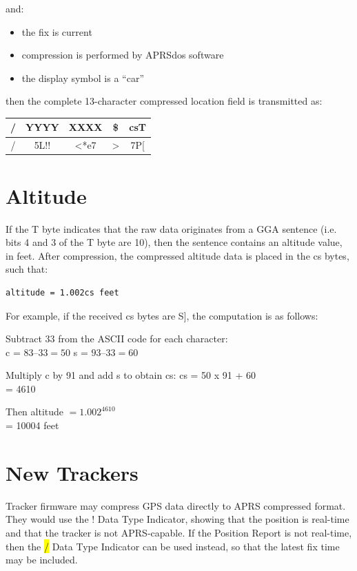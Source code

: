 {and:

\begin{itemize}
\item [] the fix is current
\item [] compression is performed by APRSdos software
\item [] the display symbol is a ``car''
\end{itemize}
then the complete 13-character compressed location field is transmitted as:


\begin{tabular}{|c|c|c|c|c|}
  \hline
  / & YYYY &  XXXX &  \$ & csT \\
  \hline 
  / & 5L!! &  <*e7 &  >  & 7P[ \\
  \hline
\end{tabular}
  
\section{Altitude}


If the T byte indicates that the raw data originates from a GGA sentence (i.e.
bits 4 and 3 of the T byte are 10), then the sentence contains an altitude
value, in feet. After compression, the compressed altitude data is placed in
the cs bytes, such that:

\begin{verbatim}
altitude = 1.002cs feet
\end{verbatim}

For example, if the received cs bytes are S], the computation is as follows:


Subtract 33 from the ASCII code for each character: \\
c = $ 83 – 33 = 50 $
s = $ 93 – 33 = 60 $


Multiply c by 91 and add s to obtain cs:
cs = 50 x 91 + 60 \\
= 4610


Then altitude $ = 1.002^{4610} $ \\
= 10004 feet

\section {New Trackers}

Tracker firmware may compress GPS data directly to APRS compressed
format. They would use the ! Data Type Indicator, showing that the position
is real-time and that the tracker is not APRS-capable.
If the Position Report is not real-time, then the \hl{/} Data Type Indicator can be
used instead, so that the latest fix time may be included.


}

